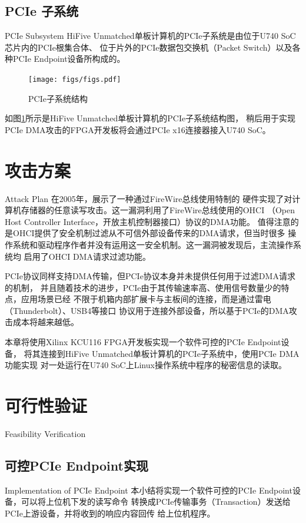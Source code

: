 \subsection{PCIe 子系统}{PCIe Subsystem}
HiFive Unmatched单板计算机的PCIe子系统是由位于U740 SoC芯片内的PCIe根集合体、
位于片外的PCIe数据包交换机（Packet Switch）以及各种PCIe Endpoint设备所构成的。

\begin{figure}[ht]
	\centering
	\texttt{[image: figs/figs.pdf]}
	\caption{PCIe子系统结构}
	\label{fig:unmatched-pcie}
\end{figure}

如图\ref{fig:unmatched-pcie}所示是HiFive Unmatched单板计算机的PCIe子系统结构图，
稍后用于实现PCIe DMA攻击的FPGA开发板将会通过PCIe x16连接器接入U740 SoC。

\section{攻击方案}{Attack Plan} \label{sec:pcie-dma}
在2005年，\citet{becher2005firewire}展示了一种通过FireWire总线使用特制的
硬件实现了对计算机存储器的任意读写攻击。这一漏洞利用了FireWire总线使用的OHCI
（Open Host Controller Interface，开放主机控制器接口）协议的DMA功能。
值得注意的是OHCI提供了安全机制过滤从不可信外部设备传来的DMA请求，但当时很多
操作系统和驱动程序作者并没有运用这一安全机制。这一漏洞被发现后，主流操作系统均
启用了OHCI DMA请求过滤功能。

PCIe协议同样支持DMA传输，但PCIe协议本身并未提供任何用于过滤DMA请求的机制，
并且随着技术的进步，PCIe由于其传输速率高、使用信号数量少的特点，应用场景已经
不限于机箱内部扩展卡与主板间的连接，而是通过雷电（Thunderbolt）、USB4等接口
协议用于连接外部设备，所以基于PCIe的DMA攻击成本将越来越低。

本章将使用Xilinx KCU116 FPGA开发板实现一个软件可控的PCIe Endpoint设备，
将其连接到HiFive Unmatched单板计算机的PCIe子系统中，使用PCIe DMA功能实现
对一处运行在U740 SoC上Linux操作系统中程序的秘密信息的读取。


\section{可行性验证}{Feasibility Verification} \label{sec:dma-impl}
\subsection{可控PCIe Endpoint实现}{Implementation of PCIe Endpoint}
本小结将实现一个软件可控的PCIe Endpoint设备，可以将上位机下发的读写命令
转换成PCIe传输事务（Transaction）发送给PCIe上游设备，并将收到的响应内容回传
给上位机程序。

